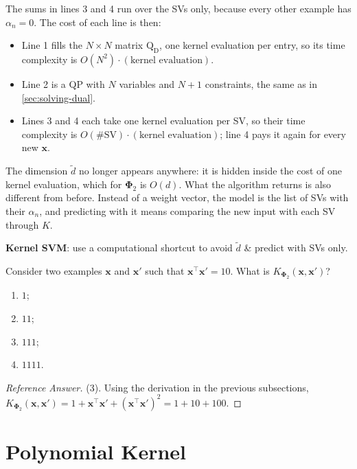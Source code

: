 The sums in lines 3 and 4 run over the SVs only, because every other example
has \(\alpha_n = 0\). The cost of each line is then:
\begin{itemize}
    \item Line 1 fills the \(N \times N\) matrix
        \(\mathrm{Q}_{\mathrm{D}}\), one kernel evaluation per entry, so its
        time complexity is \(O(N^2) \cdot (\text{kernel evaluation})\).
    \item Line 2 is a QP with \(N\) variables and \(N + 1\) constraints, the
        same as in \autoref{sec:solving-dual}.
    \item Lines 3 and 4 each take one kernel evaluation per SV, so their time
        complexity is \(O(\#\text{SV}) \cdot (\text{kernel evaluation})\);
        line 4 pays it again for every new \(\bm{x}\).
\end{itemize}
The dimension \(\tilde{d}\) no longer appears anywhere: it is hidden inside
the cost of one kernel evaluation, which for \(\bm{\Phi}_2\) is \(O(d)\).
What the algorithm returns is also different from before. Instead of a
weight vector, the model is the list of SVs with their \(\alpha_n\), and
predicting with it means comparing the new input with each SV through
\(K\).

\begin{moral}
    \textbf{Kernel SVM}: use a computational shortcut to avoid
    \(\tilde{d}\) \& predict with SVs only.
\end{moral}

\begin{exercise}
    Consider two examples \(\bm{x}\) and \(\bm{x}'\) such that
    \(\bm{x}^\top \bm{x}' = 10\). What is \(K_{\bm{\Phi}_2}(\bm{x},
    \bm{x}')\)?
    \begin{enumerate}[(1)]
        \item \(1\);
        \item \(11\);
        \item \(111\);
        \item \(1111\).
    \end{enumerate}
\end{exercise}

\begin{proof}[Reference Answer]
    (3). Using the derivation in the previous subsections,
    \(K_{\bm{\Phi}_2}(\bm{x}, \bm{x}') = 1 + \bm{x}^\top \bm{x}' +
    (\bm{x}^\top \bm{x}')^2 = 1 + 10 + 100\).
\end{proof}

\section{Polynomial Kernel}\label{sec:poly-kernel}

